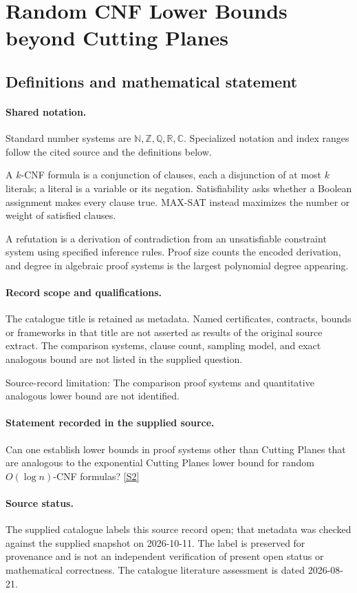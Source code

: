 \documentclass[11pt]{article}
\newcommand{\sref}[2]{\hyperlink{source:#1:#2}{[S#2]}}
\begin{document}
\section{Random CNF Lower Bounds beyond Cutting Planes}\label{statement}

\subsection{Definitions and mathematical statement}

\paragraph{Shared notation.}Standard number systems are $\mathbb N,\mathbb Z,\mathbb Q,\mathbb R,\mathbb C$. Specialized notation and index ranges follow the cited source and the definitions below.


A $k$-CNF formula is a conjunction of clauses, each a disjunction of at most $k$ literals; a literal is a variable or its negation. Satisfiability asks whether a Boolean assignment makes every clause true. MAX-SAT instead maximizes the number or weight of satisfied clauses.

A refutation is a derivation of contradiction from an unsatisfiable constraint system using specified inference rules. Proof size counts the encoded derivation, and degree in algebraic proof systems is the largest polynomial degree appearing.
\paragraph{Record scope and qualifications.}
The catalogue title is retained as metadata. Named certificates, contracts, bounds or frameworks in that title are not asserted as results of the original source extract.
The comparison systems, clause count, sampling model, and exact analogous bound are not listed in the supplied question.

Source-record limitation: The comparison proof systems and quantitative analogous lower bound are not identified.
\paragraph{Statement recorded in the supplied source.}
Can one establish lower bounds in proof systems other than Cutting Planes that are analogous to the exponential Cutting Planes lower bound for random $O(\log n)$-CNF formulas? \sref{statement}{2}
\paragraph{Source status.}
The supplied catalogue labels this source record open; that metadata was checked against the supplied snapshot on 2026-10-11. The label is preserved for provenance and is not an independent verification of present open status or mathematical correctness. The catalogue literature assessment is dated 2026-08-21.
\end{document}
